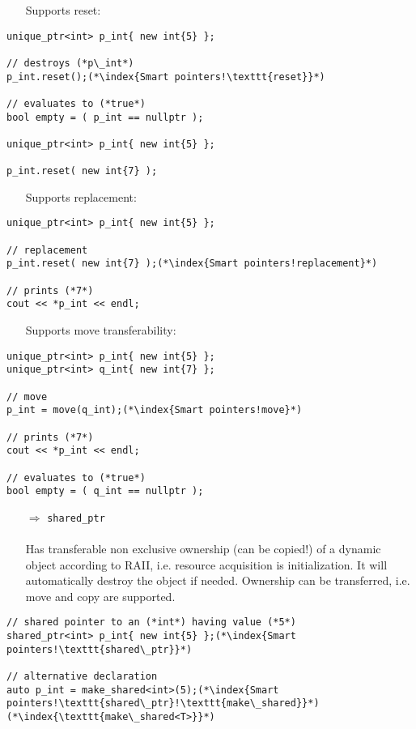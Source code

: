 \documentclass[10pt]{article}
\begin{document}
\begin{enumerate}
\item[] Supports reset:
\end{enumerate}
\begin{lstlisting}
unique_ptr<int> p_int{ new int{5} };

// destroys (*p\_int*)    
p_int.reset();(*\index{Smart pointers!\texttt{reset}}*)

// evaluates to (*true*)
bool empty = ( p_int == nullptr );

unique_ptr<int> p_int{ new int{5} };

p_int.reset( new int{7} );
\end{lstlisting}
\begin{enumerate}
\item[] Supports replacement:
\end{enumerate}
\begin{lstlisting}
unique_ptr<int> p_int{ new int{5} };

// replacement
p_int.reset( new int{7} );(*\index{Smart pointers!replacement}*)

// prints (*7*)
cout << *p_int << endl;
\end{lstlisting}
\begin{enumerate}
\item[] Supports move transferability:
\end{enumerate}
\begin{lstlisting}
unique_ptr<int> p_int{ new int{5} };
unique_ptr<int> q_int{ new int{7} };

// move
p_int = move(q_int);(*\index{Smart pointers!move}*)

// prints (*7*)
cout << *p_int << endl;

// evaluates to (*true*)
bool empty = ( q_int == nullptr );
\end{lstlisting}
\begin{enumerate}
\item[$\Rightarrow$] \texttt{shared\_ptr}\\ \\
Has transferable non exclusive ownership (can be copied!) of a dynamic object according to RAII, i.e. resource acquisition is initialization. It will 
automatically destroy the object if needed. Ownership can be transferred, i.e. move and copy are supported. 
\end{enumerate}
\begin{lstlisting}
// shared pointer to an (*int*) having value (*5*)
shared_ptr<int> p_int{ new int{5} };(*\index{Smart pointers!\texttt{shared\_ptr}}*)

// alternative declaration
auto p_int = make_shared<int>(5);(*\index{Smart pointers!\texttt{shared\_ptr}!\texttt{make\_shared}}*)(*\index{\texttt{make\_shared<T>}}*)
\end{lstlisting}
\end{document}
